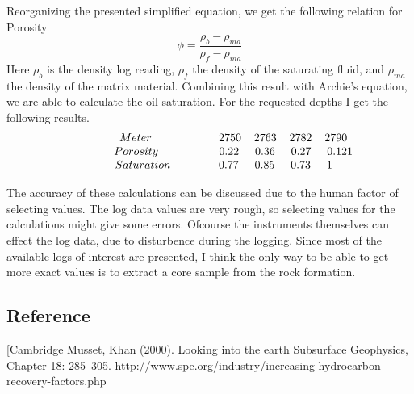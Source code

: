 \documentclass[a4paper,norsk]{article}
\begin{document}
Reorganizing the presented simplified equation, we get the following relation for Porosity
\[ \phi = \frac{\rho_b - \rho_{ma}}{\rho_f - \rho_{ma}} \]
Here $\rho_b$ is the density log reading, $\rho_f $ the density of the saturating fluid, and $\rho_{ma}$ the density of the matrix material. Combining this result with Archie's equation, we are able to calculate the oil saturation. For the requested depths I get the following results.
\begin{align*}
\begin{matrix}
\hspace{15mm} Meter \hspace{21mm} 2750 \hspace{4mm}2763 \hspace{4mm} 2782 \hspace{4mm} 2790\\
\hspace{15mm} Porosity \hspace{19mm} 0.22 \hspace{5mm} 0.36 \hspace{5mm} 0.27 \hspace{5mm} 0.121 \\
\hspace{9mm} Saturation \hspace{15mm} 0.77 \hspace{5mm} 0.85 \hspace{5mm} 0.73 \hspace{5mm} 1
\end{matrix}
\end{align*}

The accuracy of these calculations can be discussed due to the human factor of selecting values. The log data values are very rough, so selecting values for the calculations might give some errors. Ofcourse the instruments themselves can effect the log data, due to disturbence during the logging. Since most of the available logs of interest are presented, I think the only way to be able to get more exact values is to extract a core sample from the rock formation.


\subsection*{Reference}
[Cambridge Musset, Khan (2000). Looking into the earth Subsurface Geophysics, Chapter 18: 285–305.
\newline http://www.spe.org/industry/increasing-hydrocarbon-recovery-factors.php
\end{document}
